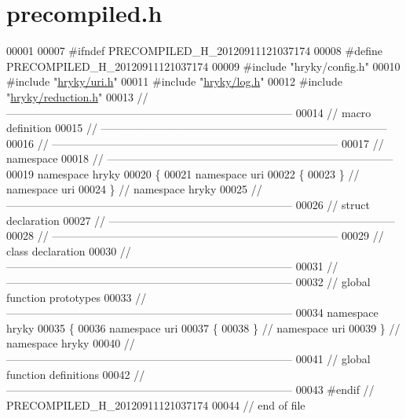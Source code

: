 \hypertarget{uri_2src_2precompiled_8h_source}{\section{precompiled.\-h}
}

\begin{DoxyCode}
00001 
00007 \textcolor{preprocessor}{#ifndef PRECOMPILED\_H\_20120911121037174}
00008 \textcolor{preprocessor}{}\textcolor{preprocessor}{#define PRECOMPILED\_H\_20120911121037174}
00009 \textcolor{preprocessor}{}\textcolor{preprocessor}{#include "hryky/config.h"}
00010 \textcolor{preprocessor}{#include "\hyperlink{uri_8h}{hryky/uri.h}"}
00011 \textcolor{preprocessor}{#include "\hyperlink{log_8h}{hryky/log.h}"}
00012 \textcolor{preprocessor}{#include "\hyperlink{reduction_8h}{hryky/reduction.h}"}
00013 \textcolor{comment}{//
      ------------------------------------------------------------------------------}
00014 \textcolor{comment}{// macro definition}
00015 \textcolor{comment}{//
      ------------------------------------------------------------------------------}
00016 \textcolor{comment}{//
      ------------------------------------------------------------------------------}
00017 \textcolor{comment}{// namespace}
00018 \textcolor{comment}{//
      ------------------------------------------------------------------------------}
00019 \textcolor{keyword}{namespace }hryky
00020 \{
00021 \textcolor{keyword}{namespace }uri
00022 \{
00023 \} \textcolor{comment}{// namespace uri}
00024 \} \textcolor{comment}{// namespace hryky}
00025 \textcolor{comment}{//
      ------------------------------------------------------------------------------}
00026 \textcolor{comment}{// struct declaration}
00027 \textcolor{comment}{//
      ------------------------------------------------------------------------------}
00028 \textcolor{comment}{//
      ------------------------------------------------------------------------------}
00029 \textcolor{comment}{// class declaration}
00030 \textcolor{comment}{//
      ------------------------------------------------------------------------------}
00031 \textcolor{comment}{//
      ------------------------------------------------------------------------------}
00032 \textcolor{comment}{// global function prototypes}
00033 \textcolor{comment}{//
      ------------------------------------------------------------------------------}
00034 \textcolor{keyword}{namespace }hryky
00035 \{
00036 \textcolor{keyword}{namespace }uri
00037 \{
00038 \} \textcolor{comment}{// namespace uri}
00039 \} \textcolor{comment}{// namespace hryky}
00040 \textcolor{comment}{//
      ------------------------------------------------------------------------------}
00041 \textcolor{comment}{// global function definitions}
00042 \textcolor{comment}{//
      ------------------------------------------------------------------------------}
00043 \textcolor{preprocessor}{#endif // PRECOMPILED\_H\_20120911121037174}
00044 \textcolor{preprocessor}{}\textcolor{comment}{// end of file}
\end{DoxyCode}
